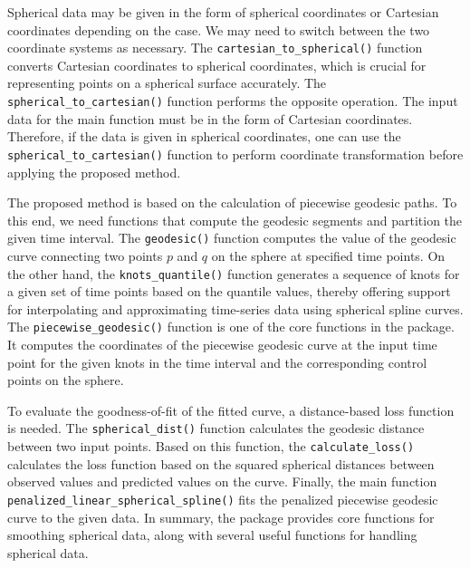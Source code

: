 Spherical data may be given in the form of spherical coordinates or Cartesian coordinates depending on the case. We may need to switch between the two coordinate systems as necessary. The \texttt{cartesian\_to\_spherical()} function converts Cartesian coordinates to spherical coordinates, which is crucial for representing points on a spherical surface accurately. The \texttt{spherical\_to\_cartesian()} function performs the opposite operation. The input data for the main function must be in the form of Cartesian coordinates. Therefore, if the data is given in spherical coordinates, one can use the \texttt{spherical\_to\_cartesian()} function to perform coordinate transformation before applying the proposed method.

The proposed method is based on the calculation of piecewise geodesic paths. To this end, we need functions that compute the geodesic segments and partition the given time interval. The \texttt{geodesic()} function computes the value of the geodesic curve connecting two points \(p\) and \(q\) on the sphere at specified time points. On the other hand, the \texttt{knots\_quantile()} function generates a sequence of knots for a given set of time points based on the quantile values, thereby offering support for interpolating and approximating time-series data using spherical spline curves. The \texttt{piecewise\_geodesic()} function is one of the core functions in the package. It computes the coordinates of the piecewise geodesic curve at the input time point for the given knots in the time interval and the corresponding control points on the sphere.

To evaluate the goodness-of-fit of the fitted curve, a distance-based loss function is needed. The \texttt{spherical\_dist()} function calculates the geodesic distance between two input points. Based on this function, the \texttt{calculate\_loss()} calculates the loss function based on the squared spherical distances between observed values and predicted values on the curve. Finally, the main function \texttt{penalized\_linear\_spherical\_spline()} fits the penalized piecewise geodesic curve to the given data. In summary, the  package provides core functions for smoothing spherical data, along with several useful functions for handling spherical data.


